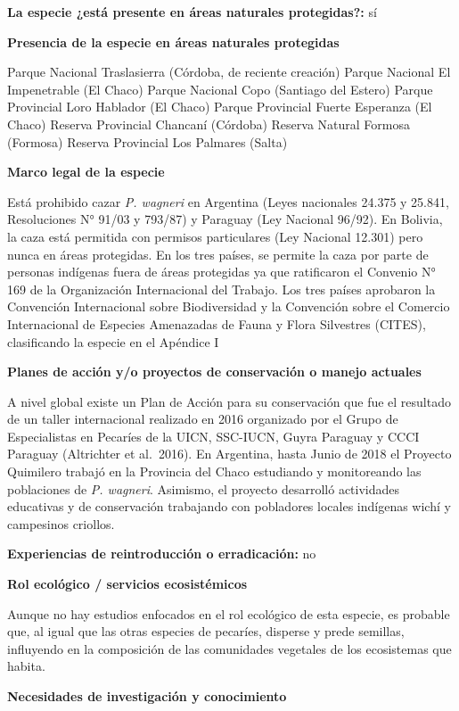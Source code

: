 \documentclass[
  x11names]{article}
\begin{document}
\textbf{La especie ¿está presente en áreas naturales protegidas?:} sí

\textbf{Presencia de la especie en áreas naturales protegidas}

Parque Nacional Traslasierra (Córdoba, de reciente creación) Parque
Nacional El Impenetrable (El Chaco) Parque Nacional Copo (Santiago del
Estero) Parque Provincial Loro Hablador (El Chaco) Parque Provincial
Fuerte Esperanza (El Chaco) Reserva Provincial Chancaní (Córdoba)
Reserva Natural Formosa (Formosa) Reserva Provincial Los Palmares
(Salta)

\textbf{Marco legal de la especie}

Está prohibido cazar \textit{P. wagneri} en Argentina (Leyes nacionales
24.375 y 25.841, Resoluciones N° 91/03 y 793/87) y Paraguay (Ley
Nacional 96/92). En Bolivia, la caza está permitida con permisos
particulares (Ley Nacional 12.301) pero nunca en áreas protegidas. En
los tres países, se permite la caza por parte de personas indígenas
fuera de áreas protegidas ya que ratificaron el Convenio N° 169 de la
Organización Internacional del Trabajo. Los tres países aprobaron la
Convención Internacional sobre Biodiversidad y la Convención sobre el
Comercio Internacional de Especies Amenazadas de Fauna y Flora
Silvestres (CITES), clasificando la especie en el Apéndice I

\textbf{Planes de acción y/o proyectos de conservación o manejo
actuales}

A nivel global existe un Plan de Acción para su conservación que fue el
resultado de un taller internacional realizado en 2016 organizado por el
Grupo de Especialistas en Pecaríes de la UICN, SSC-IUCN, Guyra Paraguay
y CCCI Paraguay (Altrichter et al.~2016). En Argentina, hasta Junio de
2018 el Proyecto Quimilero trabajó en la Provincia del Chaco estudiando
y monitoreando las poblaciones de \textit{P. wagneri}. Asimismo, el
proyecto desarrolló actividades educativas y de conservación trabajando
con pobladores locales indígenas wichí y campesinos criollos.

\textbf{Experiencias de reintroducción o erradicación:} no

\textbf{Rol ecológico / servicios ecosistémicos}

Aunque no hay estudios enfocados en el rol ecológico de esta especie, es
probable que, al igual que las otras especies de pecaríes, disperse y
prede semillas, influyendo en la composición de las comunidades
vegetales de los ecosistemas que habita.

\textbf{Necesidades de investigación y conocimiento}
\end{document}
